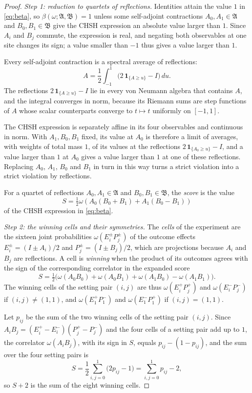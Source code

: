 \documentclass[11pt]{amsart}
\numberwithin{equation}{section}
\theoremstyle{definition}
\newcommand{\A}{\mathfrak A}
\newcommand{\B}{\mathfrak B}
\begin{document}
\begin{proof}
\emph{Step 1: reduction to quartets of reflections.} Identities attain
the value \(1\) in \eqref{eq:beta}, so \(\beta(\omega;\A,\B)=1\) unless
some self-adjoint contractions \(A_0,A_1\in\A\) and \(B_0,B_1\in\B\) give
the CHSH expression an absolute value larger than \(1\). Since \(A_i\)
and \(B_j\) commute, the expression is real, and negating both
observables at one site changes its sign; a value smaller than \(-1\)
thus gives a value larger than \(1\).

Every self-adjoint contraction is a spectral average of reflections:
\[
 A=\frac12\int_{-1}^1
 \bigl(2\,\mathbf1_{\{A\ge u\}}-I\bigr)\,du.
\]
The reflections \(2\,\mathbf1_{\{A\ge u\}}-I\) lie in every von Neumann
algebra that contains \(A\), and the integral converges in norm, because
its Riemann sums are step functions of \(A\) whose scalar counterparts
converge to \(t\mapsto t\) uniformly on \([-1,1]\).

The CHSH expression is separately affine in its four observables and
continuous in norm. With \(A_1,B_0,B_1\) fixed, its value at \(A_0\) is
therefore a limit of averages, with weights of total mass \(1\), of its
values at the reflections \(2\,\mathbf1_{\{A_0\ge u\}}-I\), and a value
larger than \(1\) at \(A_0\) gives a value larger than \(1\) at one of
these reflections. Replacing \(A_0\), \(A_1\), \(B_0\) and \(B_1\) in
turn in this way turns a strict violation into a strict violation by
reflections.

For a quartet of reflections \(A_0,A_1\in\A\) and \(B_0,B_1\in\B\),
the \emph{score} is the value
\[
 S=\tfrac12\omega(A_0(B_0+B_1)+A_1(B_0-B_1))
\]
of the CHSH expression in \eqref{eq:beta}.

\smallskip
\emph{Step 2: the winning cells and their symmetries.} The
\emph{cells} of the experiment are the sixteen joint probabilities
\(\omega(E_i^\pm P_j^\pm)\) of the outcome effects
\(E_i^\pm=(I\pm A_i)/2\) and \(P_j^\pm=(I\pm B_j)/2\), which are
projections because \(A_i\) and \(B_j\) are reflections.
A cell is \emph{winning} when the product of its outcomes agrees with
the sign of the corresponding correlator in the expanded score
\[
 S=\tfrac12\bigl(\omega(A_0B_0)+\omega(A_0B_1)+\omega(A_1B_0)
 -\omega(A_1B_1)\bigr).
\]
The winning cells of the setting pair \((i,j)\) are thus
\(\omega(E_i^+P_j^+)\) and \(\omega(E_i^-P_j^-)\) if \((i,j)\ne(1,1)\),
and \(\omega(E_1^+P_1^-)\) and \(\omega(E_1^-P_1^+)\) if \((i,j)=(1,1)\).

Let \(p_{ij}\) be the sum of the two winning cells of the setting pair
\((i,j)\). Since \(A_iB_j=(E_i^+-E_i^-)(P_j^+-P_j^-)\) and the four cells
of a setting pair add up to \(1\), the correlator \(\omega(A_iB_j)\), with
its sign in \(S\), equals \(p_{ij}-(1-p_{ij})\), and the sum over the four
setting pairs is
\[
 S=\frac12\sum_{i,j=0}^1\bigl(2p_{ij}-1\bigr)
 =\sum_{i,j=0}^1p_{ij}-2,
\]
so \(S+2\) is the sum of the eight winning cells.


\end{proof}
\end{document}
